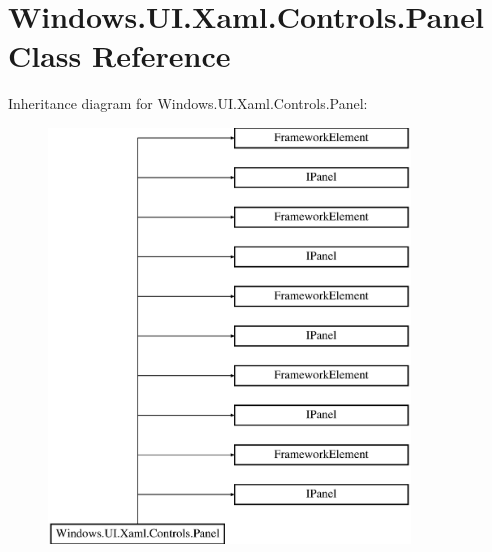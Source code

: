 \hypertarget{class_windows_1_1_u_i_1_1_xaml_1_1_controls_1_1_panel}{}\section{Windows.\+U\+I.\+Xaml.\+Controls.\+Panel Class Reference}
\label{class_windows_1_1_u_i_1_1_xaml_1_1_controls_1_1_panel}
Inheritance diagram for Windows.\+U\+I.\+Xaml.\+Controls.\+Panel\+:\begin{figure}[H]
\begin{center}
\leavevmode
\includegraphics[height=11.000000cm]{class_windows_1_1_u_i_1_1_xaml_1_1_controls_1_1_panel}
\end{center}
\end{figure}
